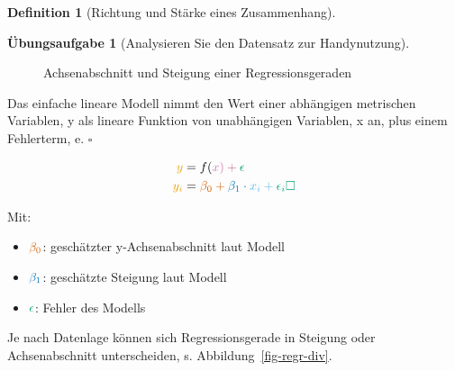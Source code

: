 \documentclass[
  a4paper,
  DIV=11]{scrreprt}
\providecommand{\tightlist}{%
  \setlength{\itemsep}{0pt}\setlength{\parskip}{0pt}}\usepackage{longtable,booktabs,array}
\theoremstyle{definition}
\newtheorem{exercise}{Übungsaufgabe}[chapter]
\theoremstyle{definition}
\theoremstyle{definition}
\newtheorem{definition}{Definition}[chapter]
\theoremstyle{remark}
\begin{document}
\begin{definition}[Richtung und Stärke eines
Zusammenhang]
\begin{exercise}[Analysieren Sie den Datensatz zur
Handynutzung]
\begin{figure}
{}

\caption{\label{fig-regrtex}Achsenabschnitt und Steigung einer
Regressionsgeraden}

\end{figure}%

\begin{tcolorbox}[enhanced jigsaw, leftrule=.75mm, opacitybacktitle=0.6, colback=white, colframe=quarto-callout-important-color-frame, coltitle=black, colbacktitle=quarto-callout-important-color!10!white, opacityback=0, left=2mm, breakable, titlerule=0mm, toptitle=1mm, bottomtitle=1mm, rightrule=.15mm, title=\textcolor{quarto-callout-important-color}{\faExclamation}\hspace{0.5em}{Das einfache lineare Modell}, arc=.35mm, bottomrule=.15mm, toprule=.15mm]

Das einfache lineare Modell nimmt den Wert einer {abhängigen metrischen
Variablen, y} als lineare Funktion von {unabhängigen Variablen, x} an,
plus einem {Fehlerterm, e}. \(\square\)

\end{tcolorbox}

\[\begin{aligned}
\color{ycol}{y} &= f(\color{xcol}{x}) + \color{errorcol}{\epsilon} \\
\color{ycol}{y_i} &= \color{beta0col}{\beta_0} + \color{beta1col}{\beta_1} \cdot \color{modelcol}{x_i} + \color{errorcol}{\epsilon_i} \square
\end{aligned}\]

Mit:

\begin{itemize}
\tightlist
\item
  \(\color{beta0col}{\beta_0}\): geschätzter y-Achsenabschnitt laut
  Modell
\item
  \(\color{beta1col}{\beta_1}\): geschätzte Steigung laut Modell
\item
  \(\color{errorcol}{\epsilon}\): Fehler des Modells
\end{itemize}

Je nach Datenlage können sich Regressionsgerade in Steigung oder
Achsenabschnitt unterscheiden, s. Abbildung~\ref{fig-regr-div}.

\begin{figure}

\begin{minipage}{0.50\linewidth}

\centering{

}
\end{minipage}
\end{figure}
\end{exercise}
\end{definition}
\end{document}
